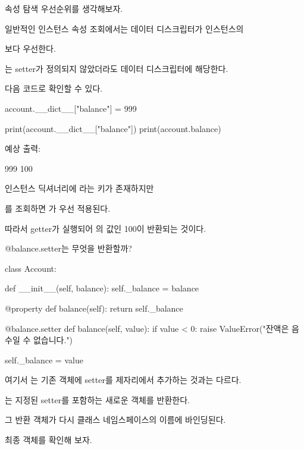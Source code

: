 속성 탐색 우선순위를 생각해보자.

일반적인 인스턴스 속성 조회에서는 데이터 디스크립터가 인스턴스의 

보다 우선한다.

는 setter가 정의되지 않았더라도 데이터 디스크립터에 해당한다.

다음 코드로 확인할 수 있다.

\begin{dhkcode}
account.__dict__["balance"] = 999

print(account.__dict__["balance"])
print(account.balance)
\end{dhkcode}

예상 출력:

\begin{dhkzsh}
999
100
\end{dhkzsh}

인스턴스 딕셔너리에 라는 키가 존재하지만

를 조회하면 가 우선 적용된다.

따라서 getter가 실행되어 의 값인 100이 반환되는 것이다.

\begin{dhknote}
\begin{dhksmry}[centered]
@balance.setter는 무엇을 반환할까?
\end{dhksmry}
\end{dhknote}

\begin{dhkcode}
class Account:

    def __init__(self, balance):
        self._balance = balance

    @property
    def balance(self):
        return self._balance

    @balance.setter
    def balance(self, value):
        if value < 0:
            raise ValueError("잔액은 음수일 수 없습니다.")

        self._balance = value
\end{dhkcode}

여기서 는 기존  객체에 setter를 제자리에서 추가하는 것과는 다르다.

는 지정된 setter를 포함하는 새로운  객체를 반환한다.

그 반환 객체가 다시 클래스 네임스페이스의  이름에 바인딩된다.

최종 객체를 확인해 보자.

